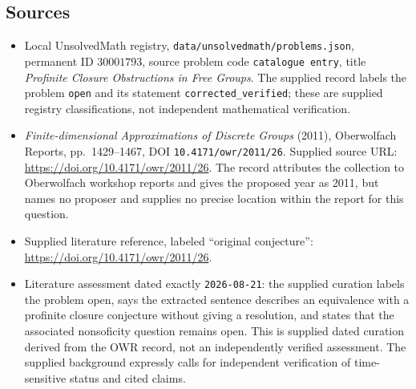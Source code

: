 \documentclass[11pt]{article}
\begin{document}
\subsection{Sources}
\begin{itemize}
\item Local UnsolvedMath registry, \texttt{data/unsolvedmath/problems.json}, permanent ID \(30001793\), source problem code \texttt{catalogue entry}, title \emph{Profinite Closure Obstructions in Free Groups}. The supplied record labels the problem \texttt{open} and its statement \texttt{corrected\_verified}; these are supplied registry classifications, not independent mathematical verification.
\item \emph{Finite-dimensional Approximations of Discrete Groups} (2011), Oberwolfach Reports, pp.\ 1429--1467, DOI \texttt{10.4171/owr/2011/26}. Supplied source URL: \url{https://doi.org/10.4171/owr/2011/26}. The record attributes the collection to Oberwolfach workshop reports and gives the proposed year as 2011, but names no proposer and supplies no precise location within the report for this question.
\item Supplied literature reference, labeled ``original conjecture'': \url{https://doi.org/10.4171/owr/2011/26}.
\item Literature assessment dated exactly \texttt{2026-08-21}: the supplied curation labels the problem open, says the extracted sentence describes an equivalence with a profinite closure conjecture without giving a resolution, and states that the associated nonsoficity question remains open. This is supplied dated curation derived from the OWR record, not an independently verified assessment. The supplied background expressly calls for independent verification of time-sensitive status and cited claims.
\end{itemize}
\end{document}
